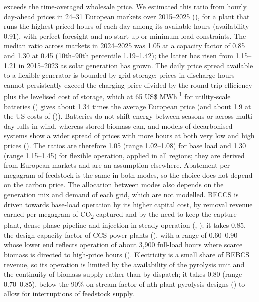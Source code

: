 \documentclass[
  letterpaper,
]{article}
\begin{document}
exceeds the time-averaged wholesale price. We estimated this ratio from
hourly day-ahead prices in 24--31 European markets over 2015--2025
(), for a plant that runs the
highest-priced hours of each day among its available hours (availability
0.91), with perfect foresight and no start-up or minimum-load
constraints. The median ratio across markets in 2024--2025 was 1.05 at a
capacity factor of 0.85 and 1.30 at 0.45 (10th--90th percentile
1.19--1.42); the latter has risen from 1.15--1.21 in 2015--2023 as solar
generation has grown. The daily price spread available to a flexible
generator is bounded by grid storage: prices in discharge hours cannot
persistently exceed the charging price divided by the round-trip
efficiency plus the levelised cost of storage, which at 65 US\$
MWh\textsuperscript{-1} for utility-scale batteries
() gives about 1.34 times the
average European price (and about 1.9 at the US costs of
()). Batteries do not shift energy
between seasons or across multi-day lulls in wind, whereas stored
biomass can, and models of decarbonised systems show a wider spread of
prices with more hours at both very low and high prices
(). The ratios are therefore 1.05
(range 1.02--1.08) for base load and 1.30 (range 1.15--1.45) for
flexible operation, applied in all regions; they are derived from
European markets and are an assumption elsewhere. Abatement per megagram
of feedstock is the same in both modes, so the choice does not depend on
the carbon price. The allocation between modes also depends on the
generation mix and demand of each grid, which are not modelled. BECCS is
driven towards base-load operation by its higher capital cost, by
removal revenue earned per megagram of CO\textsubscript{2} captured and
by the need to keep the capture plant, dense-phase pipeline and
injection in steady operation (,
); it takes 0.85, the design capacity
factor of CCS power plants (),
with a range of 0.60--0.90 whose lower end reflects operation of about
3,900 full-load hours where scarce biomass is directed to high-price
hours (). Electricity is a small
share of BEBCS revenue, so its operation is limited by the availability
of the pyrolysis unit and the continuity of biomass supply rather than
by dispatch; it takes 0.80 (range 0.70--0.85), below the 90\% on-stream
factor of nth-plant pyrolysis designs
() to allow for interruptions of
feedstock supply.
\end{document}
